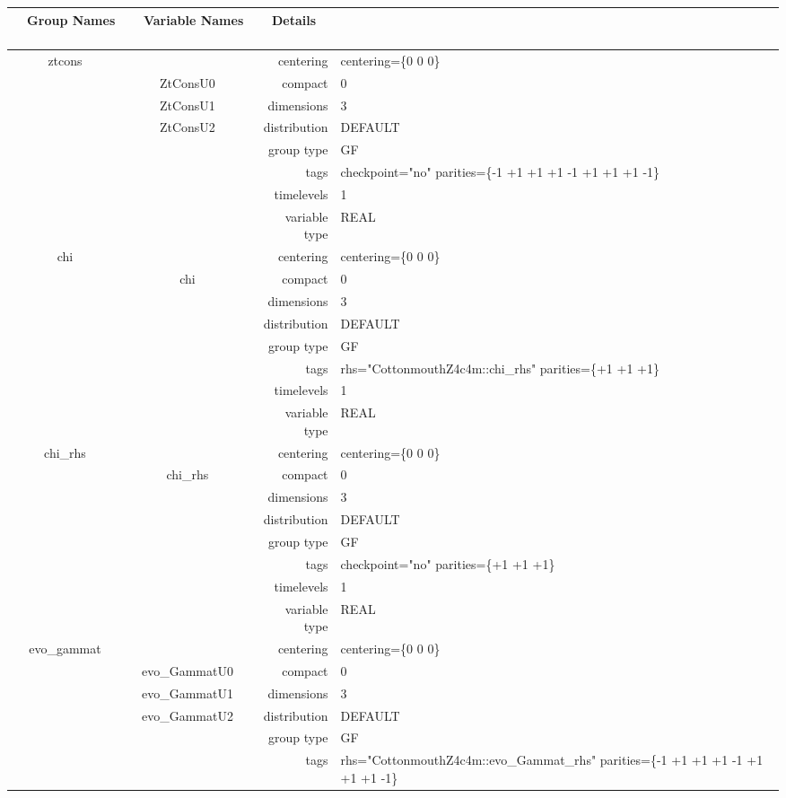 \documentclass{article}
\begin{document}
\begin{tabular*}{150mm}{|c|c@{\extracolsep{\fill}}|rl|} \hline 
~ {\bf Group Names} ~ & ~ {\bf Variable Names} ~  &{\bf Details} ~ & ~ \\ 
\hline 
ztcons &  & centering & centering=\{0 0 0\} \\ 
 & ZtConsU0 & compact & 0 \\ 
 & ZtConsU1 & dimensions & 3 \\ 
 & ZtConsU2 & distribution & DEFAULT \\ 
 &  & group type & GF \\ 
 &  & tags & checkpoint="no" parities=\{-1 +1 +1  +1 -1 +1  +1 +1 -1\} \\ 
 &  & timelevels & 1 \\ 
 &  & variable type & REAL \\ 
\hline 
chi &  & centering & centering=\{0 0 0\} \\ 
 & chi & compact & 0 \\ 
 &  & dimensions & 3 \\ 
 &  & distribution & DEFAULT \\ 
 &  & group type & GF \\ 
 &  & tags & rhs="CottonmouthZ4c4m::chi\_rhs" parities=\{+1 +1 +1\} \\ 
 &  & timelevels & 1 \\ 
 &  & variable type & REAL \\ 
\hline 
chi\_rhs &  & centering & centering=\{0 0 0\} \\ 
 & chi\_rhs & compact & 0 \\ 
 &  & dimensions & 3 \\ 
 &  & distribution & DEFAULT \\ 
 &  & group type & GF \\ 
 &  & tags & checkpoint="no" parities=\{+1 +1 +1\} \\ 
 &  & timelevels & 1 \\ 
 &  & variable type & REAL \\ 
\hline 
evo\_gammat &  & centering & centering=\{0 0 0\} \\ 
 & evo\_GammatU0 & compact & 0 \\ 
 & evo\_GammatU1 & dimensions & 3 \\ 
 & evo\_GammatU2 & distribution & DEFAULT \\ 
 &  & group type & GF \\ 
 &  & tags & rhs="CottonmouthZ4c4m::evo\_Gammat\_rhs" parities=\{-1 +1 +1  +1 -1 +1  +1 +1 -1\} \\ 

\end{tabular*}
\end{document}
